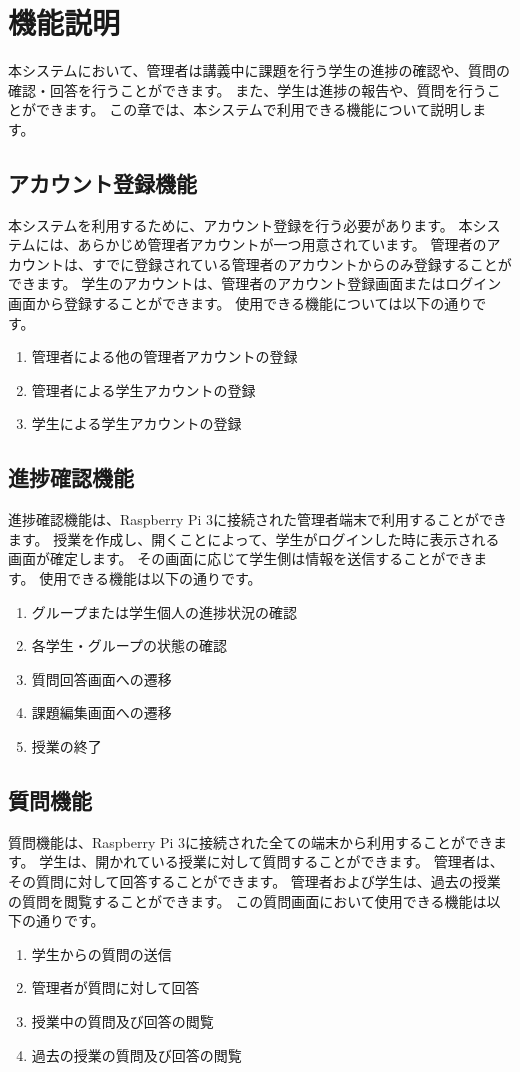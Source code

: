 \section{機能説明}
本システムにおいて、管理者は講義中に課題を行う学生の進捗の確認や、質問の確認・回答を行うことができます。
また、学生は進捗の報告や、質問を行うことができます。
この章では、本システムで利用できる機能について説明します。

\subsection{アカウント登録機能}
本システムを利用するために、アカウント登録を行う必要があります。
本システムには、あらかじめ管理者アカウントが一つ用意されています。
管理者のアカウントは、すでに登録されている管理者のアカウントからのみ登録することができます。
学生のアカウントは、管理者のアカウント登録画面またはログイン画面から登録することができます。
使用できる機能については以下の通りです。
\begin{enumerate}
  \item 管理者による他の管理者アカウントの登録
  \item 管理者による学生アカウントの登録
  \item 学生による学生アカウントの登録
\end{enumerate}

\subsection{進捗確認機能}
進捗確認機能は、Raspberry Pi 3に接続された管理者端末で利用することができます。
授業を作成し、開くことによって、学生がログインした時に表示される画面が確定します。
その画面に応じて学生側は情報を送信することができます。
使用できる機能は以下の通りです。
\begin{enumerate}
  \item グループまたは学生個人の進捗状況の確認
  \item 各学生・グループの状態の確認%
  \item 質問回答画面への遷移
  \item 課題編集画面への遷移
  \item 授業の終了
\end{enumerate}

\subsection{質問機能}
質問機能は、Raspberry Pi 3に接続された全ての端末から利用することができます。
学生は、開かれている授業に対して質問することができます。
管理者は、その質問に対して回答することができます。
管理者および学生は、過去の授業の質問を閲覧することができます。
この質問画面において使用できる機能は以下の通りです。
\begin{enumerate}
  \item 学生からの質問の送信
  \item 管理者が質問に対して回答
  \item 授業中の質問及び回答の閲覧
  \item 過去の授業の質問及び回答の閲覧
\end{enumerate}
